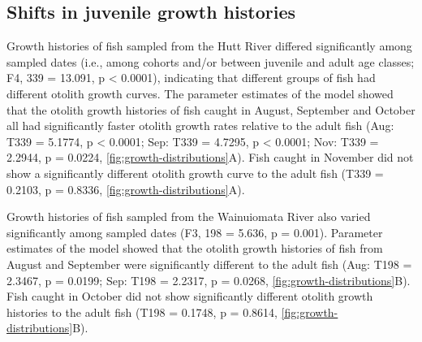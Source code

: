 \documentclass[]{book}
\begin{document}
\subsection{Shifts in juvenile growth
histories}\label{shifts-in-juvenile-growth-histories}

Growth histories of fish sampled from the Hutt River differed
significantly among sampled dates (i.e., among cohorts and/or between
juvenile and adult age classes; F4, 339 = 13.091, p \textless{} 0.0001),
indicating that different groups of fish had different otolith growth
curves. The parameter estimates of the model showed that the otolith
growth histories of fish caught in August, September and October all had
significantly faster otolith growth rates relative to the adult fish
(Aug: T339 = 5.1774, p \textless{} 0.0001; Sep: T339 = 4.7295, p
\textless{} 0.0001; Nov: T339 = 2.2944, p = 0.0224,
\ref{fig:growth-distributions}A). Fish caught in November did not show a
significantly different otolith growth curve to the adult fish (T339 =
0.2103, p = 0.8336, \ref{fig:growth-distributions}A).

Growth histories of fish sampled from the Wainuiomata River also varied
significantly among sampled dates (F3, 198 = 5.636, p = 0.001).
Parameter estimates of the model showed that the otolith growth
histories of fish from August and September were significantly different
to the adult fish (Aug: T198 = 2.3467, p = 0.0199; Sep: T198 = 2.2317, p
= 0.0268, \ref{fig:growth-distributions}B). Fish caught in October did
not show significantly different otolith growth histories to the adult
fish (T198 = 0.1748, p = 0.8614, \ref{fig:growth-distributions}B).
\end{document}
